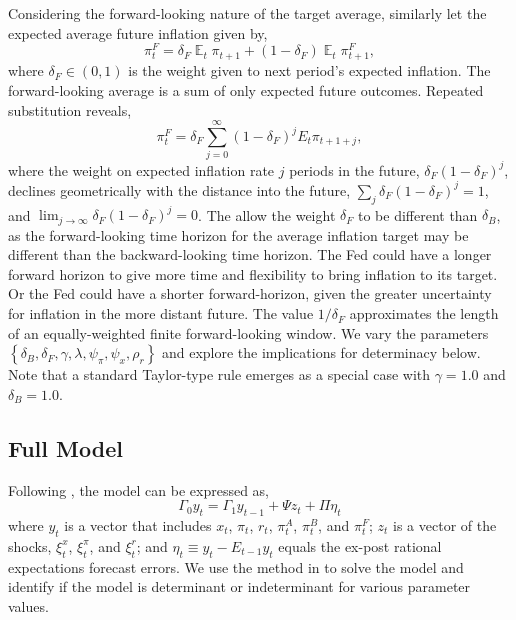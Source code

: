 \documentclass[english,authoryear,12pt]{elsarticle}
\DeclareMathOperator{\E}{\mathbb{E}}
\begin{document}
Considering the forward-looking nature of the target average, similarly let the expected average future inflation given by,
\begin{equation}\label{eq:forward}
	\pi_t^F = \delta_F \E_t \pi_{t+1} + (1-\delta_F) \E_t \pi_{t+1}^F,
\end{equation}
where $\delta_F \in (0,1)$ is the weight given to next period's expected inflation. The forward-looking average is a sum of only expected future outcomes. Repeated substitution reveals,
\begin{equation}\label{eq:forward_all}
	\pi_t^F = \delta_F \sum_{j=0}^{\infty} (1-\delta_F)^j E_t \pi_{t+1+j},
\end{equation}
where the weight on expected inflation rate $j$ periods in the future, $\delta_F (1-\delta_F)^{j}$, declines geometrically with the distance into the future, $\sum_j \delta_F (1-\delta_F)^{j}=1$, and $\lim_{j \to \infty} \delta_F (1-\delta_F)^j=0$. The allow the weight $\delta_F$ to be different than $\delta_B$, as the forward-looking time horizon for the average inflation target may be different than the backward-looking time horizon. The Fed could have a longer forward horizon to give more time and flexibility to bring inflation to its target. Or the Fed could have a shorter forward-horizon, given the greater uncertainty for inflation in the more distant future. The value $1/ \delta_F$ approximates the length of an equally-weighted finite forward-looking window. We vary the parameters $\left\{\delta_B, \delta_F, \gamma, \lambda, \psi_\pi, \psi_x, \rho_r \right\}$ and explore the implications for determinacy below. Note that a standard Taylor-type rule emerges as a special case with $\gamma=1.0$ and $\delta_B=1.0$.

\subsection{Full Model}

Following \citet{sims2002}, the model can be expressed as,
\begin{equation}
	\Gamma_0 y_t = \Gamma_1 y_{t-1} + \Psi z_t + \Pi \eta_t
\end{equation}
where $y_t$ is a vector that includes $x_t$, $\pi_t$, $r_t$, $\pi_t^A$, $\pi_t^B$, and $\pi_t^F$; $z_t$ is a vector of the shocks, $\xi_t^x$, $\xi_t^\pi$, and $\xi_t^r$; and $\eta_t \equiv y_t - E_{t-1} y_t$ equals the ex-post rational expectations forecast errors. We use the method in \citet{sims2002} to solve the model and identify if the model is determinant or indeterminant for various parameter values.
\end{document}
